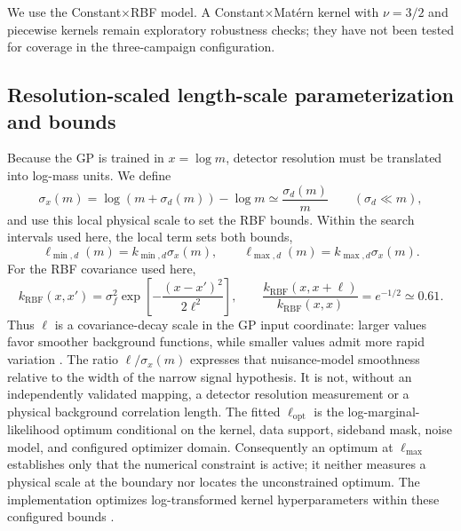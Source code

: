 We use the Constant$\times$RBF model. A Constant$\times$Mat\'ern kernel with
$\nu=3/2$ and piecewise kernels remain exploratory robustness checks; they have not
been tested for coverage in the three-campaign configuration.

\subsection{Resolution-scaled length-scale parameterization and bounds}
\label{sec:length-scale}

Because the GP is trained in $x=\log m$, detector resolution must be translated into
log-mass units. We define
\begin{equation}
\sigma_x(m) = \log\!\left(m+\sigma_d(m)\right) - \log m
\simeq \frac{\sigma_d(m)}{m}
\qquad (\sigma_d \ll m),
\end{equation}
and use this local physical scale to set the RBF bounds. Within the search intervals used here, the local term sets both bounds,
\begin{equation}
\ell_{\min,d}(m) = k_{\min,d}\sigma_x(m),
\qquad
\ell_{\max,d}(m) = k_{\max,d}\sigma_x(m).
\label{eq:dataset-lengthscale-bounds}
\end{equation}
For the RBF covariance used here,
\begin{equation}
k_{\mathrm{RBF}}(x,x') =
\sigma_f^2\exp\!\left[-\frac{(x-x')^2}{2\ell^2}\right],
\qquad
\frac{k_{\mathrm{RBF}}(x,x+\ell)}{k_{\mathrm{RBF}}(x,x)}
=e^{-1/2}\simeq0.61 .
\label{eq:rbf-lengthscale-interpretation}
\end{equation}
Thus $\ell$ is a covariance-decay scale in the GP input coordinate: larger values
favor smoother background functions, while smaller values admit more rapid
variation \cite{RasmussenWilliams2006,FrateGP2017}. The ratio
$\ell/\sigma_x(m)$ expresses that nuisance-model smoothness relative to the width of
the narrow signal hypothesis. It is not, without an independently validated mapping,
a detector resolution measurement or a physical background correlation length.
The fitted $\ell_{\mathrm{opt}}$ is the log-marginal-likelihood optimum conditional
on the kernel, data support, sideband mask, noise model, and configured optimizer
domain. Consequently an optimum at $\ell_{\max}$ establishes only that the numerical
constraint is active; it neither measures a physical scale at the boundary nor
locates the unconstrained optimum. The implementation optimizes log-transformed
kernel hyperparameters within these configured bounds
\cite{ScikitLearnGPRDocs16}.

